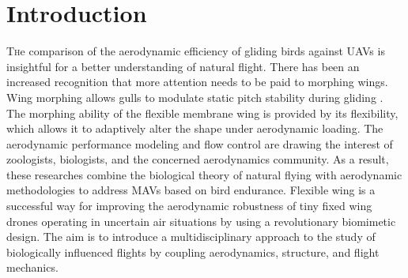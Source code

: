 \documentclass[conf]{new-aiaa}
\begin{document}
\section{Introduction}
\lettrine{T}he comparison of the aerodynamic efficiency of gliding birds against UAVs is insightful for a better understanding of natural flight.
%
There has been an increased recognition that more attention needs to be paid to morphing wings. Wing morphing allows gulls to modulate static pitch stability during gliding \cite{harvey2022birds}. 
%
The morphing ability of the flexible membrane wing is provided by its flexibility, which allows it to adaptively alter the shape under aerodynamic loading.
%
The aerodynamic performance modeling and flow control are drawing the interest of zoologists, biologists, and the concerned aerodynamics community.
%
As a result, these researches combine the biological theory of natural flying with aerodynamic methodologies to address MAVs based on bird endurance.
%
Flexible wing is a successful way for improving the aerodynamic robustness of tiny fixed wing drones operating in uncertain air situations by using a revolutionary biomimetic design.
%
The aim is to introduce a multidisciplinary approach to the study of biologically influenced flights by coupling aerodynamics, structure, and flight mechanics.
%
\end{document}
